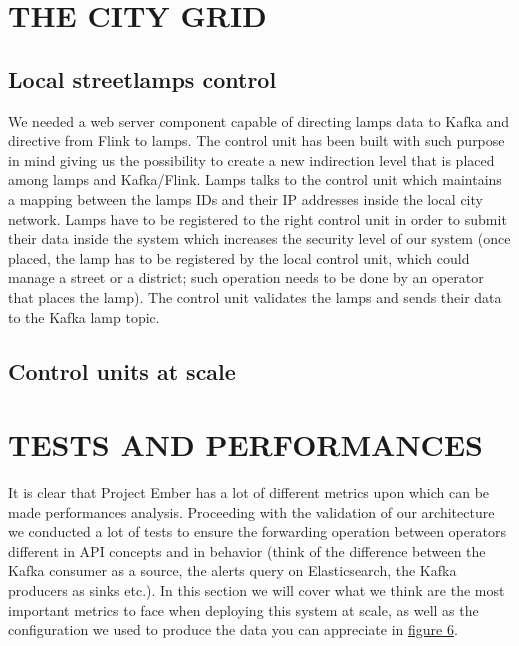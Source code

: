 \section{THE CITY GRID}

\subsection{Local streetlamps control}
We needed a web server component capable of directing lamps data to Kafka and directive from Flink to lamps. The control unit has been built with such purpose in mind giving us the possibility to create a new indirection level that is placed among lamps and Kafka/Flink. Lamps talks to the control unit which maintains a mapping between the lamps IDs and their IP addresses inside the local city network. Lamps have to be registered to the right control unit in order to submit their data inside the system which increases the security level of our system (once placed, the lamp has to be registered by the local control unit, which could manage a street or a district; such operation needs to be done by an operator that places the lamp). The control unit validates the lamps and sends their data to the Kafka lamp topic. 
\subsection{Control units at scale}


\section{TESTS AND PERFORMANCES}
It is clear that Project Ember has a lot of different metrics upon which can be made performances analysis. Proceeding with the validation of our architecture we conducted a lot of tests to ensure the forwarding operation between operators different in API concepts and in behavior (think of the difference between the Kafka consumer as a source, the alerts query on Elasticsearch, the Kafka producers as sinks etc.). In this section we will cover what we think are the most important metrics to face when deploying this system at scale, as well as the configuration we used to produce the data you can appreciate in \hyperref[fig:ember_metrics]{figure 6}.

